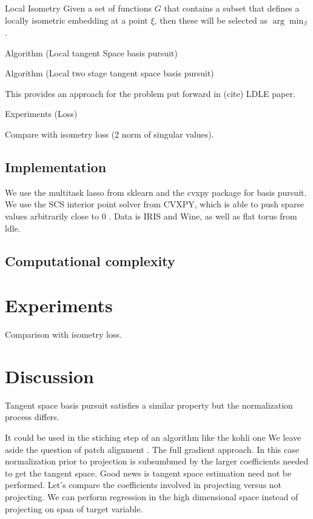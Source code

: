 \documentclass[a4paper,11pt]{article}
\begin{document}
\begin{proposition}{Local Isometry}
Given a set of functions $G$ that contains a subset that defines a locally isometric embedding at a point $\xi$, then these will be selected as $\arg \min_\beta$.
\end{proposition}

Algorithm (Local tangent Space basis pursuit)

Algorithm (Local two stage tangent space basis pursuit)

This provides an approach for the problem put forward in (cite) LDLE paper.

Experiments (Loss)

Compare with isometry loss (2 norm of singular values).

\subsection{Implementation}

We use the multitask lasso from sklearn and the cvxpy package for basis pursuit.  We use the SCS interior point solver from CVXPY, which is able to push sparse values arbitrarily close to 0 \cite{cvxpy_sparse_solution}. Data is IRIS and Wine, as well as flat torus from ldle.
\subsection{Computational complexity}
\section{Experiments}

Comparison with isometry loss.

\section{Discussion}


Tangent space basis pursuit satisfies a similar property \cite{Koelle2022-lp} but the normalization process differs.

It could be used in the stiching step of an algorithm like the kohli one
We leave aside the question of patch alignment \cite{https://arxiv.org/pdf/2303.11620.pdf, LDLE paper}.
The full gradient approach.
In this case normalization prior to projection is subsumbmed by the larger coefficients needed to get the tangent space.
Good news is tangent space estimation need not be performed.
Let's compare the coefficients involved in projecting versus not projecting.
We can perform regression in the high dimensional space instead of projecting on span of target variable.
\end{document}
